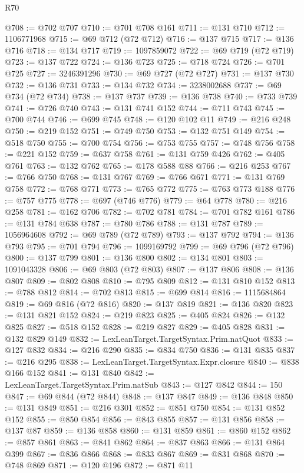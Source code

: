 \begin{lexlean}{R70}
\begin{coremodule}
@708 := @702 @707
@710 := @701 @708 @161
@711 := @131 @710
@712 := 1106771968
@715 := @69 @712 (@72 @712)
@716 := @137 @715
@717 := @136 @716
@718 := @134 @717
@719 := 1097859072
@722 := @69 @719 (@72 @719)
@723 := @137 @722
@724 := @136 @723
@725 := @718 @724
@726 := @701 @725
@727 := 3246391296
@730 := @69 @727 (@72 @727)
@731 := @137 @730
@732 := @136 @731
@733 := @134 @732
@734 := 3238002688
@737 := @69 @734 (@72 @734)
@738 := @137 @737
@739 := @136 @738
@740 := @733 @739
@741 := @726 @740
@743 := @131 @741 @152
@744 := @711 @743
@745 := @700 @744
@746 := @699 @745
@748 := @120 @102 @11
@749 := @216 @248
@750 := @219 @152
@751 := @749 @750
@753 := @132 @751 @149
@754 := @518 @750
@755 := @700 @754
@756 := @753 @755
@757 := @748 @756
@758 := @221 @152
@759 := @637 @758
@761 := @131 @759 @426
@762 := @405 @761
@763 := @132 @762
@765 := @178 @588 @88
@766 := @216 @253
@767 := @766 @750
@768 := @131 @767
@769 := @766 @671
@771 := @131 @769 @758
@772 := @768 @771
@773 := @765 @772
@775 := @763 @773 @188
@776 := @757 @775
@778 := @697 (@746 @776)
@779 := @64 @778
@780 := @216 @258
@781 := @162 @706
@782 := @702 @781
@784 := @701 @782 @161
@786 := @131 @784 @638
@787 := @780 @786
@788 := @131 @787
@789 := 1056964608
@792 := @69 @789 (@72 @789)
@793 := @137 @792
@794 := @136 @793
@795 := @701 @794
@796 := 1099169792
@799 := @69 @796 (@72 @796)
@800 := @137 @799
@801 := @136 @800
@802 := @134 @801
@803 := 1091043328
@806 := @69 @803 (@72 @803)
@807 := @137 @806
@808 := @136 @807
@809 := @802 @808
@810 := @795 @809
@812 := @131 @810 @152
@813 := @788 @812
@814 := @702 @813
@815 := @699 @814
@816 := 1115684864
@819 := @69 @816 (@72 @816)
@820 := @137 @819
@821 := @136 @820
@823 := @131 @821 @152
@824 := @219 @823
@825 := @405 @824
@826 := @132 @825
@827 := @518 @152
@828 := @219 @827
@829 := @405 @828
@831 := @132 @829 @149
@832 := LexLeanTarget.TargetSyntax.Prim.natQuot
@833 := @127 @832
@834 := @216 @290
@835 := @834 @750
@836 := @131 @835
@837 := @216 @295
@838 := LexLeanTarget.TargetSyntax.Expr.closure
@840 := @838 @166 @152
@841 := @131 @840
@842 := LexLeanTarget.TargetSyntax.Prim.natSub
@843 := @127 @842
@844 := 150
@847 := @69 @844 (@72 @844)
@848 := @137 @847
@849 := @136 @848
@850 := @131 @849
@851 := @216 @301
@852 := @851 @750
@854 := @131 @852 @152
@855 := @850 @854
@856 := @843 @855
@857 := @131 @856
@858 := @137 @87
@859 := @136 @858
@860 := @131 @859
@861 := @860 @152
@862 := @857 @861
@863 := @841 @862
@864 := @837 @863
@866 := @131 @864 @399
@867 := @836 @866
@868 := @833 @867
@869 := @831 @868
@870 := @748 @869
@871 := @120 @196
@872 := @871 @11

\end{coremodule}
\end{lexlean}
